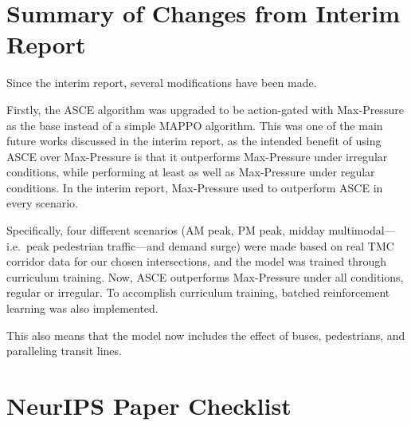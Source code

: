 \documentclass{article}
\begin{document}
\section{Summary of Changes from Interim Report}
\label{app:interim_changes}

Since the interim report, several modifications have been made.

Firstly, the ASCE algorithm was upgraded to be action-gated with Max-Pressure as the base instead of a simple MAPPO algorithm. This was one of the main future works discussed in the interim report, as the intended benefit of using ASCE over Max-Pressure is that it outperforms Max-Pressure under irregular conditions, while performing at least as well as Max-Pressure under regular conditions. In the interim report, Max-Pressure used to outperform ASCE in every scenario.

Specifically, four different scenarios (AM peak, PM peak, midday multimodal---i.e.\ peak pedestrian traffic---and demand surge) were made based on real TMC corridor data for our chosen intersections, and the model was trained through curriculum training. Now, ASCE outperforms Max-Pressure under all conditions, regular or irregular. To accomplish curriculum training, batched reinforcement learning was also implemented.

This also means that the model now includes the effect of buses, pedestrians, and paralleling transit lines.


\section*{NeurIPS Paper Checklist}
\end{document}
